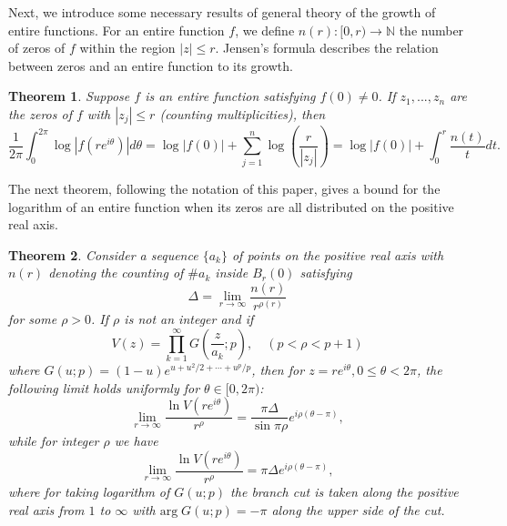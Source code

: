 \documentclass[graybox]{svmult}
\newcommand{\N}{\mathbb{N}}
\newtheorem{mainthm}{Theorem}
\begin{document}
Next, we introduce some necessary results of general theory of the growth of entire functions. For an entire function $f$, we define $n(r): [0,r) \to \N$ the number of zeros of $f$ within the region $|z|\leq r$. Jensen's formula describes the relation between zeros and an entire function to its growth.
\begin{mainthm}\cite[Formule 7]{jensen1899nouvel}\label{Jensen}
    Suppose $f$ is an entire function satisfying $f(0) \neq 0$. If $z_1, ..., z_n$ are the zeros of $f$ with $|z_j| \leq r$ (counting multiplicities), then 
    \begin{equation*}
        \frac{1}{2\pi} \int_0^{2\pi}\log|f(re^{i \theta})| d\theta  =\log|f(0)| + \sum_{j=1}^n \log(\frac{r}{|z_j|}) = \log|f(0)| + \int_0^r \frac{n(t)}{t}dt.
    \end{equation*}
\end{mainthm}
The next theorem, following the notation of this paper, gives a bound for the logarithm of an entire function when its zeros are all distributed on the positive real axis. 
\begin{mainthm}\cite[Chapter I, Theorem 25]{levin1964distribution}\label{Levin}
    Consider a sequence $\{ a_k \}$ of points on the positive real axis with $n(r)$ denoting the counting of $\# a_k$ inside $B_r(0)$ satisfying
    \begin{equation*}
       \Delta = \lim_{r \to \infty} \frac{n(r)}{r^{\rho(r)}}
    \end{equation*}
    for some $\rho>0$. If $\rho$ is not an integer and if 
    \begin{equation*}
        V(z) = \prod_{k=1}^{\infty}G(\frac{z}{a_k};p), \quad (p < \rho <p+1)
    \end{equation*}
    where $G(u;p) = (1-u)e^{u +u^2/2 + \cdots +u^p/p}$,
    then for $z = re^{i\theta}, 0 \leq \theta <2\pi$, the following limit holds uniformly for $\theta \in [0,2\pi)$:
    \begin{equation*}
        \lim_{r\to \infty}\frac{\ln V(re^{i\theta})}{r^{\rho}} = \frac{\pi \Delta}{\sin \pi \rho}e^{i \rho(\theta - \pi)},
    \end{equation*}
    while for integer $\rho$ we have 
    \begin{equation*}
        \lim_{r\to \infty}\frac{\ln V(re^{i\theta})}{r^{\rho}} = \pi \Delta e^{i \rho(\theta - \pi)},
    \end{equation*}
    where for taking logarithm of $G(u;p)$ the branch cut is taken along the positive real axis from $1$ to $\infty$ with $\text{arg} \; G(u;p) = -\pi$ along the upper side of the cut.
\end{mainthm}
\end{document}
